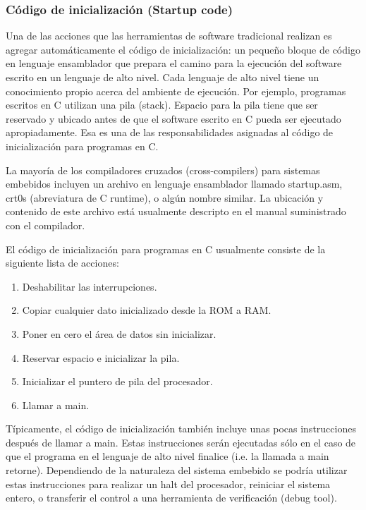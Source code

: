 \documentclass[12pt]{article}
\begin{document}
\subsubsection *{Código de inicialización (Startup code)}

Una de las acciones que las herramientas de software tradicional realizan
es agregar automáticamente el código de inicialización: un pequeño bloque
de código en lenguaje ensamblador que prepara el camino para la ejecución
del software escrito en un lenguaje de alto nivel. Cada lenguaje de alto
nivel tiene un conocimiento propio acerca del ambiente de ejecución.
Por ejemplo, programas escritos en C utilizan una pila (stack). Espacio
para la pila tiene que ser reservado y ubicado antes de que el software escrito
en C pueda ser ejecutado apropiadamente. Esa es una de las responsabilidades
asignadas al código de inicialización para programas en C.

La mayoría de los compiladores cruzados (cross-compilers) para sistemas
embebidos incluyen un archivo en lenguaje ensamblador llamado startup.asm, crt0s
(abreviatura de C runtime), o algún nombre similar. La ubicación y contenido de este
archivo está usualmente descripto en el manual suministrado con el compilador.

El código de inicialización para programas en C usualmente consiste de la siguiente
lista de acciones:

\begin{enumerate}
\item Deshabilitar las interrupciones.
\item Copiar cualquier dato inicializado desde la ROM a RAM.
\item Poner en cero el área de datos sin inicializar.
\item Reservar espacio e inicializar la pila.
\item Inicializar el puntero de pila del procesador.
\item Llamar a main.
\end{enumerate}

Típicamente, el código de inicialización también incluye unas pocas
instrucciones después de llamar a main. Estas instrucciones serán ejecutadas
sólo en el caso de que el programa en el lenguaje de alto nivel finalice (i.e.
la llamada a main retorne). Dependiendo de la naturaleza del sistema embebido
se podría utilizar estas instrucciones para realizar un halt del procesador, 
reiniciar el sistema entero, o transferir el control a una herramienta
de verificación (debug tool).
\end{document}
